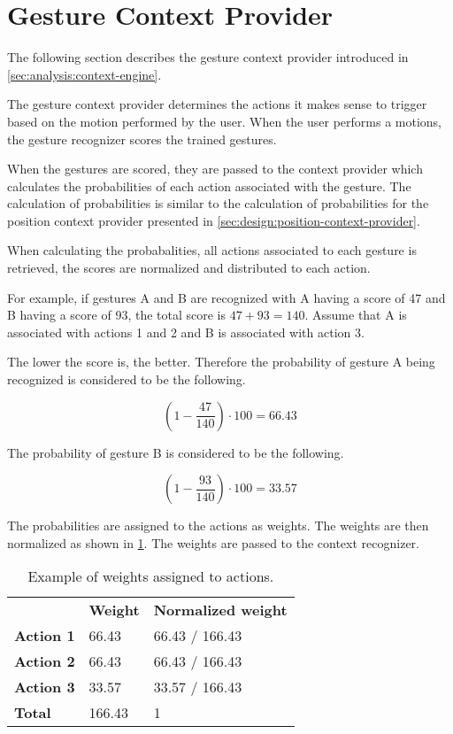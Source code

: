 \section{Gesture Context Provider}
\label{sec:design:gesture-context-provider}

The following section describes the gesture context provider introduced in \cref{sec:analysis:context-engine}.

The gesture context provider determines the actions it makes sense to trigger based on the motion performed by the user. When the user performs a motions, the gesture recognizer scores the trained gestures.

When the gestures are scored, they are passed to the context provider which calculates the probabilities of each action associated with the gesture. The calculation of probabilities is similar to the calculation of probabilities for the position context provider presented in \cref{sec:design:position-context-provider}.

When calculating the probabalities, all actions associated to each gesture is retrieved, the scores are normalized and distributed to each action.

For example, if gestures A and B are recognized with A having a score of 47 and B having a score of 93, the total score is $47 + 93 = 140$. Assume that A is associated with actions 1 and 2 and B is associated with action 3.

The lower the score is, the better. Therefore the probability of gesture A being recognized is considered to be the following.

\begin{equation*}
(1 - \frac{47}{140}) \cdot 100 = 66.43
\end{equation*}

The probability of gesture B is considered to be the following.

\begin{equation*}
(1 - \frac{93}{140}) \cdot 100 = 33.57
\end{equation*}

The probabilities are assigned to the actions as weights. The weights are then normalized as shown in \cref{tbl:sec:design:gesture-context-provider:weighted-actions}. The weights are passed to the context recognizer.

\begin{table}[h!]
\centering
\caption{Example of weights assigned to actions.}
\label{tbl:sec:design:gesture-context-provider:weighted-actions}
\begin{tabular}{lll}
                  & \textbf{Weight} & \textbf{Normalized weight} \\
\textbf{Action 1} & 66.43           & 66.43 / 166.43             \\
\textbf{Action 2} & 66.43           & 66.43 / 166.43             \\
\textbf{Action 3} & 33.57           & 33.57 / 166.43             \\
\textbf{Total}    & 166.43          & 1                         
\end{tabular}
\end{table}

